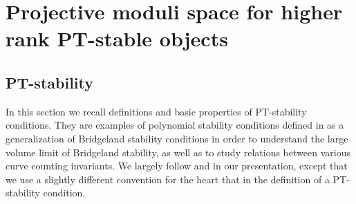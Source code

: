 \chapter{Projective moduli space for higher rank PT-stable objects}\label{chapter:pt}




\section{PT-stability}
In this section we recall definitions and basic properties of PT-stability conditions. They are examples of polynomial stability conditions defined in \cite{bayer-polynomial} as a generalization of Bridgeland stability conditions in order to understand the large volume limit of Bridgeland stability, as well as to study relations between various curve counting invariants. We largely follow \cite{lo-PT1} and \cite{lo-PT2} in our presentation, except that we use a slightly different convention for the heart that in the definition of a PT-stability condition.

